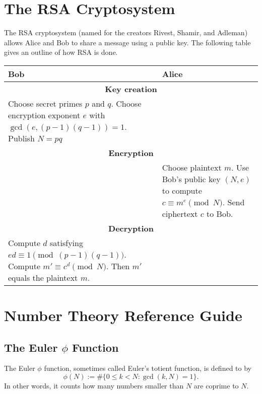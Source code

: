 \documentclass{article}
\begin{document}
\section{The RSA Cryptosystem}

    The RSA cryptosystem (named for the creators Rivest, Shamir, and Adleman) allows Alice and Bob to share a message using a public key.
    The following table gives an outline of how RSA is done.

    \begin{table}[h!]
        \centering
        \begin{tabular}{|p{5cm}|p{5cm}|}
            \hline
            \textbf{Bob} & \textbf{Alice}\\
            \hline\hline
            \multicolumn{2}{|c|}{\bf Key creation}\\
            \hline
            Choose secret primes \(p\) and \(q\).
            Choose encryption exponent \(e\) with \(\gcd(e,(p-1)(q-1))=1\).
            Publish \(N=pq\) &\\
            \hline
            \multicolumn{2}{|c|}{\bf Encryption}\\
            \hline
            & Choose plaintext \(m\).
            Use Bob's public key \((N,e)\) to compute \(c\equiv m^e\pmod{N}\).
            Send ciphertext \(c\) to Bob.\\
            \hline
            \multicolumn{2}{|c|}{\bf Decryption}\\
            \hline
            Compute \(d\) satisfying \(ed\equiv 1\pmod{(p-1)(q-1)}\).
            Compute \(m' \equiv c^d\pmod{N}\).
            Then \(m'\) equals the plaintext \(m\).&\\
            \hline
        \end{tabular}
    \end{table}

\section{Number Theory Reference Guide}

    \subsection{The Euler \(\phi\) Function}

        \begin{definition}
            The Euler \(\phi\) function, sometimes called Euler's totient function, is defined to by
            \[\phi(N) := \#\{0\leq k<N : \gcd(k,N) = 1\}.\]
            In other words, it counts how many numbers smaller than \(N\) are coprime to \(N\).
        \end{definition}
\end{document}
